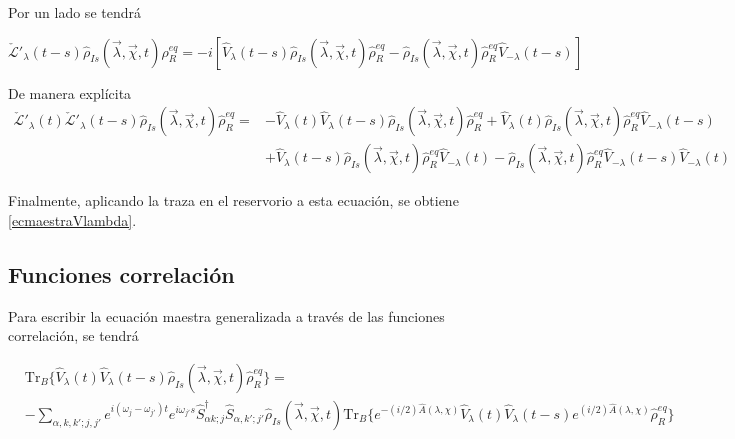 \begin{appendixs}
Por un lado se tendrá

\begin{equation*}
    \check{\mathcal{L}}'_{\lambda}(t-s)\hat{\rho}_{Is}(\vec{\lambda},\vec{\chi},t)\rho_{R}^{eq} = -i[\hat{V}_{\lambda}(t-s)\hat{\rho}_{Is}(\vec{\lambda},\vec{\chi},t)\hat{\rho}^{eq}_{R} -  \hat{\rho}_{Is}(\vec{\lambda},\vec{\chi},t)\hat{\rho}^{eq}_{R}\hat{V}_{-\lambda}(t-s)]
\end{equation*}

De manera explícita
\begin{align*}
    \check{\mathcal{L}}'_{\lambda}(t)\check{\mathcal{L}}'_{\lambda}(t-s)\hat{\rho}_{Is}(\vec{\lambda},\vec{\chi},t)\hat{\rho}_{R}^{eq}  = &  -\hat{V}_{\lambda}(t)\hat{V}_{\lambda}(t-s)\hat{\rho}_{Is}(\vec{\lambda},\vec{\chi},t)\hat{\rho}_{R}^{eq} + \hat{V}_{\lambda}(t)\hat{\rho}_{Is}(\vec{\lambda},\vec{\chi},t)\hat{\rho}_{R}^{eq}\hat{V}_{-\lambda}(t-s) \\
    & + \hat{V}_{\lambda}(t-s)\hat{\rho}_{Is}(\vec{\lambda},\vec{\chi},t)\hat{\rho}_{R}^{eq}\hat{V}_{-\lambda}(t) - \hat{\rho}_{Is}(\vec{\lambda},\vec{\chi},t)\hat{\rho}_{R}^{eq}\hat{V}_{-\lambda}(t-s)\hat{V}_{-\lambda}(t)
\end{align*}

Finalmente, aplicando la traza en el reservorio a esta ecuación, se obtiene \ref{ecmaestraVlambda}.

    \label{apendixsubsectionmatriz}
    
\newpage

\subsection{Funciones correlación}
Para escribir la ecuación maestra generalizada a través de las funciones correlación, se tendrá

\begin{align*}
& \text{Tr}_{B}\{ \hat{V}_{\lambda}(t)\hat{V}_{\lambda}(t-s) \hat{\rho}_{Is}(\vec{\lambda},\vec{\chi},t)\hat{\rho}^{eq}_{R} \}  =\\
&  - \sum_{\alpha,k,k';j,j'}e^{i(\omega_{j}-\omega_{j'})t}e^{i\omega_{j'}s}\hat{S}^{\dagger}_{\alpha k;j}\hat{S}_{\alpha,k';j'}\hat{\rho}_{Is}(\vec{\lambda},\vec{\chi},t)\text{Tr}_{B}\{e^{-(i/2)\hat{A}(\lambda,\chi)}\hat{V}_{\lambda}(t)\hat{V}_{\lambda}(t-s)e^{(i/2)\hat{A}(\lambda,\chi)}\hat{\rho}^{eq}_{R}\} 
\end{align*}    


\end{appendixs}
